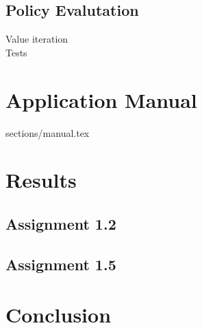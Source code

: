 \documentclass{article}
\begin{document}
\subsection{Policy Evalutation}


Value iteration\\
Tests\\

\section{Application Manual}
 {sections/manual.tex}

\section{Results}
\label{sec:results}

\subsection{Assignment 1.2}


\subsection{Assignment 1.5}


\section{Conclusion}
\end{document}
